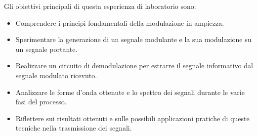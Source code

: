 \newline
\newline
Gli obiettivi principali di questa esperienza di laboratorio sono:
\begin{itemize}
    \item Comprendere i principi fondamentali della modulazione in ampiezza.
    \item Sperimentare la generazione di un segnale modulante e la sua modulazione su un segnale portante.
    \item Realizzare un circuito di demodulazione per estrarre il segnale informativo dal segnale modulato ricevuto.
    \item Analizzare le forme d'onda ottenute e lo spettro dei segnali durante le varie fasi del processo.
    \item Riflettere sui risultati ottenuti e sulle possibili applicazioni pratiche di queste tecniche nella trasmissione dei segnali.
\end{itemize}

\pagebreak
